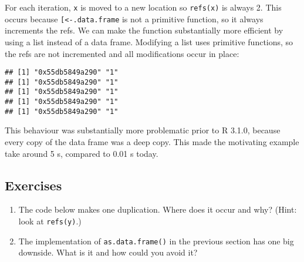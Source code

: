 For each iteration, \texttt{x} is moved to a new location so
\texttt{refs(x)} is always 2. This occurs because
\texttt{{[}\textless{}-.data.frame} is not a primitive function, so it
always increments the refs. We can make the function substantially more
efficient by using a list instead of a data frame. Modifying a list uses
primitive functions, so the refs are not incremented and all
modifications occur in place:

\begin{Shaded}
\begin{Highlighting}[]
\StringTok{ }

 \OperatorTok{:}\NormalTok{) \{}
\StringTok{ }\OperatorTok{-}\StringTok{ }
  \NormalTok{(}\NormalTok{(}
\NormalTok{\}}
\end{Highlighting}
\end{Shaded}

\begin{verbatim}
## [1] "0x55db5849a290" "1"             
## [1] "0x55db5849a290" "1"             
## [1] "0x55db5849a290" "1"             
## [1] "0x55db5849a290" "1"             
## [1] "0x55db5849a290" "1"
\end{verbatim}

This behaviour was substantially more problematic prior to R 3.1.0,
because every copy of the data frame was a deep copy. This made the
motivating example take around 5 s, compared to 0.01 s today.

\hypertarget{exercises-2}{%
\subsection{Exercises}\label{exercises-2}}

\begin{enumerate}
\def\labelenumi{\arabic{enumi}.}
\item
  The code below makes one duplication. Where does it occur and why?
  (Hint: look at \texttt{refs(y)}.)

\begin{Shaded}
\begin{Highlighting}[]
\StringTok{ }
 
\StringTok{ }\OperatorTok{-}\StringTok{ }
\NormalTok{\}}
\end{Highlighting}
\end{Shaded}
\item
  The implementation of \texttt{as.data.frame()} in the previous section
  has one big downside. What is it and how could you avoid it?
\end{enumerate}
